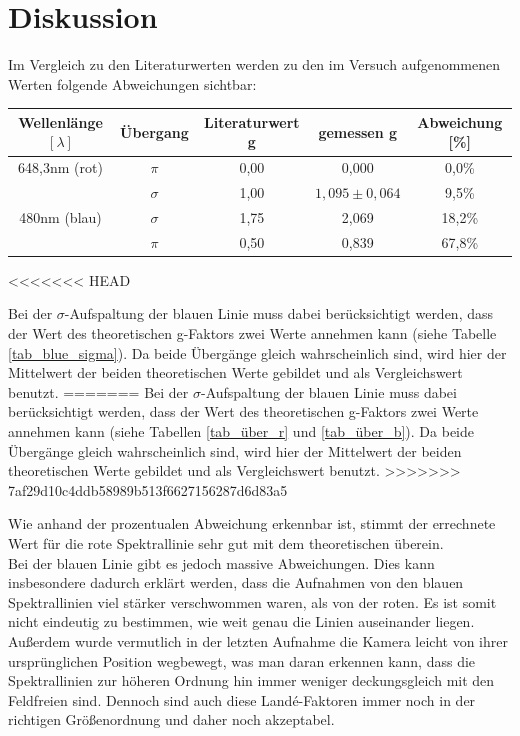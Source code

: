 \section{Diskussion}
Im Vergleich zu den Literaturwerten werden zu den im Versuch aufgenommenen Werten folgende Abweichungen sichtbar:
\begin{table}[htbp]
\begin{tabular}{|c|c|c|c|c|}
Wellenlänge $[\lambda]$ & Übergang & Literaturwert g& gemessen g& Abweichung [\%]\\\hline
648,3nm (rot) 	& $\pi$		&	0,00	&	0,000	&	0,0\%	\\\hline
				& $\sigma$	&	1,00	&	$1,095\pm0,064$	&	9,5\%	\\\hline
480nm (blau)	& $\sigma$	&	1,75	&	2,069	&	18,2\%\\\hline
				& $\pi$		&	0,50	&	0,839	&	67,8\%\\\hline
\end{tabular}
\end{table}

<<<<<<< HEAD

Bei der  $\sigma$-Aufspaltung der blauen Linie muss dabei berücksichtigt werden, dass der Wert des theoretischen g-Faktors zwei Werte annehmen kann (siehe Tabelle \ref{tab_blue_sigma}). Da beide Übergänge gleich wahrscheinlich sind, wird hier der Mittelwert der beiden theoretischen Werte gebildet und als Vergleichswert benutzt.
=======
Bei der  $\sigma$-Aufspaltung der blauen Linie muss dabei berücksichtigt werden, dass der Wert des theoretischen g-Faktors zwei Werte annehmen kann (siehe Tabellen \ref{tab_über_r} und \ref{tab_über_b}). Da beide Übergänge gleich wahrscheinlich sind, wird hier der Mittelwert der beiden theoretischen Werte gebildet und als Vergleichswert benutzt.
>>>>>>> 7af29d10c4ddb58989b513f6627156287d6d83a5

Wie anhand der prozentualen Abweichung erkennbar ist, stimmt der errechnete Wert für die rote Spektrallinie sehr gut mit dem theoretischen überein.\\
Bei der blauen Linie gibt es jedoch massive Abweichungen. Dies kann insbesondere dadurch erklärt werden, dass die Aufnahmen von den blauen Spektrallinien viel stärker verschwommen waren, als von der roten. Es ist somit nicht eindeutig zu bestimmen, wie weit genau die Linien auseinander liegen. Außerdem wurde vermutlich in der letzten Aufnahme die Kamera leicht von ihrer ursprünglichen Position wegbewegt, was man daran erkennen kann, dass die Spektrallinien zur höheren Ordnung hin immer weniger deckungsgleich mit den Feldfreien sind. Dennoch sind auch diese Landé-Faktoren immer noch in der richtigen Größenordnung und daher noch akzeptabel.\\

